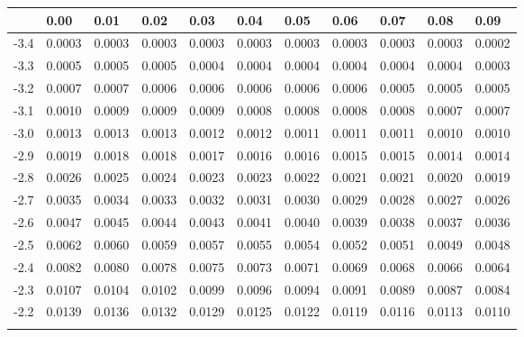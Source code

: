 \begin{tabular}{l|llllllllll}
     & 0.00   & 0.01   & 0.02   & 0.03   & 0.04   & 0.05   & 0.06   & 0.07   & 0.08  & 0.09 \\ \hline
-3.4 & 0.0003 & 0.0003 & 0.0003 & 0.0003 & 0.0003 & 0.0003 & 0.0003 & 0.0003 & 0.0003 & 0.0002 \\\arrayrulecolor{light-gray}\hline\arrayrulecolor{black} 
-3.3 & 0.0005 & 0.0005 & 0.0005 & 0.0004 & 0.0004 & 0.0004 & 0.0004 & 0.0004 & 0.0004 & 0.0003 \\\arrayrulecolor{light-gray}\hline\arrayrulecolor{black} 
-3.2 & 0.0007 & 0.0007 & 0.0006 & 0.0006 & 0.0006 & 0.0006 & 0.0006 & 0.0005 & 0.0005 & 0.0005 \\\arrayrulecolor{light-gray}\hline\arrayrulecolor{black} 
-3.1 & 0.0010 & 0.0009 & 0.0009 & 0.0009 & 0.0008 & 0.0008 & 0.0008 & 0.0008 & 0.0007 & 0.0007 \\\arrayrulecolor{light-gray}\hline\arrayrulecolor{black} 
-3.0 & 0.0013 & 0.0013 & 0.0013 & 0.0012 & 0.0012 & 0.0011 & 0.0011 & 0.0011 & 0.0010 & 0.0010 \\\arrayrulecolor{light-gray}\hline\arrayrulecolor{black} 
-2.9 & 0.0019 & 0.0018 & 0.0018 & 0.0017 & 0.0016 & 0.0016 & 0.0015 & 0.0015 & 0.0014 & 0.0014 \\\arrayrulecolor{light-gray}\hline\arrayrulecolor{black} 
-2.8 & 0.0026 & 0.0025 & 0.0024 & 0.0023 & 0.0023 & 0.0022 & 0.0021 & 0.0021 & 0.0020 & 0.0019 \\\arrayrulecolor{light-gray}\hline\arrayrulecolor{black} 
-2.7 & 0.0035 & 0.0034 & 0.0033 & 0.0032 & 0.0031 & 0.0030 & 0.0029 & 0.0028 & 0.0027 & 0.0026 \\\arrayrulecolor{light-gray}\hline\arrayrulecolor{black} 
-2.6 & 0.0047 & 0.0045 & 0.0044 & 0.0043 & 0.0041 & 0.0040 & 0.0039 & 0.0038 & 0.0037 & 0.0036 \\\arrayrulecolor{light-gray}\hline\arrayrulecolor{black} 
-2.5 & 0.0062 & 0.0060 & 0.0059 & 0.0057 & 0.0055 & 0.0054 & 0.0052 & 0.0051 & 0.0049 & 0.0048 \\\arrayrulecolor{light-gray}\hline\arrayrulecolor{black} 
-2.4 & 0.0082 & 0.0080 & 0.0078 & 0.0075 & 0.0073 & 0.0071 & 0.0069 & 0.0068 & 0.0066 & 0.0064 \\\arrayrulecolor{light-gray}\hline\arrayrulecolor{black} 
-2.3 & 0.0107 & 0.0104 & 0.0102 & 0.0099 & 0.0096 & 0.0094 & 0.0091 & 0.0089 & 0.0087 & 0.0084 \\\arrayrulecolor{light-gray}\hline\arrayrulecolor{black} 
-2.2 & 0.0139 & 0.0136 & 0.0132 & 0.0129 & 0.0125 & 0.0122 & 0.0119 & 0.0116 & 0.0113 & 0.0110 \\\arrayrulecolor{light-gray}\hline\arrayrulecolor{black} 

\end{tabular}
